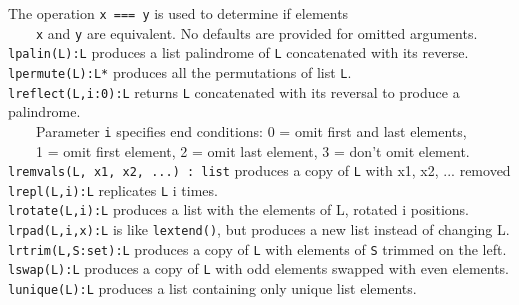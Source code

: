The operation \texttt{x === y} is used to determine if elements\\
 \ \ \ \  \texttt{x} and \texttt{y} are equivalent.
No defaults are provided for omitted arguments. \\ %
\texttt{lpalin(L):L} produces a list palindrome of \texttt{L}
concatenated with its reverse.\\
\texttt{lpermute(L):L*} produces all the permutations of list
\texttt{L}.\\
\texttt{lreflect(L,i:0):L} returns \texttt{L} concatenated with its
reversal to produce a palindrome.\\
 \ \ \ \ Parameter \texttt{i} specifies
end conditions: 0 = omit first and last elements,\\
 \ \ \ \ 1 = omit first element, 2 = omit last element,
 3 = don't omit element.\\
\texttt{lremvals(L, x1, x2, ...) : list} produces a copy of \texttt{L} with
x1, x2, ... removed\\
\texttt{lrepl(L,i):L} replicates \texttt{L} i
times.\\
\texttt{lrotate(L,i):L} produces a list with the elements of L, rotated i
positions.\\
\texttt{lrpad(L,i,x):L} is like \texttt{lextend()}, but produces a new list instead of
changing L.\\
\texttt{lrtrim(L,S:set):L} produces a copy of \texttt{L} with elements of \texttt{S} trimmed on
 the left.\\
\texttt{lswap(L):L} produces a copy of \texttt{L} with odd elements swapped with even
elements.\\
\texttt{lunique(L):L} produces a list containing only unique list elements.

